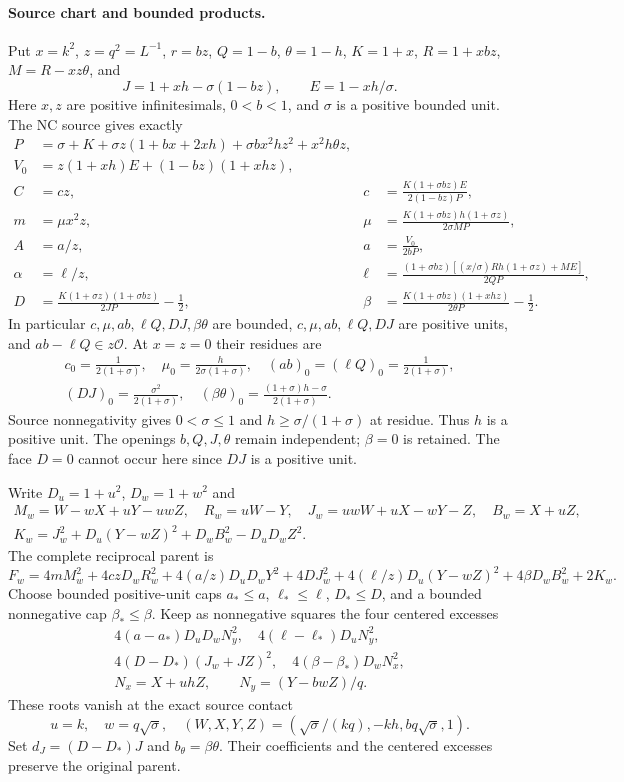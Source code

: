 \paragraph{Source chart and bounded products.}
Put $x=k^2$, $z=q^2=L^{-1}$, $r=bz$, $Q=1-b$, $\theta=1-h$,
$K=1+x$, $R=1+xbz$, $M=R-xz\theta$, and
\[
 J=1+xh-\sigma(1-bz),\qquad E=1-xh/\sigma.
\]
Here $x,z$ are positive infinitesimals, $0<b<1$, and $\sigma$ is a positive
bounded unit. The NC source gives exactly
\begin{align*}
 P&=\sigma+K+\sigma z(1+bx+2xh)+\sigma bx^2hz^2+x^2h\theta z,\\
 V_0&=z(1+xh)E+(1-bz)(1+xhz),\\
 C&=cz,&c&=\frac{K(1+\sigma bz)E}{2(1-bz)P},\\
 m&=\mu x^2z,&\mu&=\frac{K(1+\sigma bz)h(1+\sigma z)}{2\sigma MP},\\
 A&=a/z,&a&=\frac{V_0}{2bP},\\
 \alpha&=\ell/z,&\ell&=\frac{(1+\sigma bz)[(x/\sigma)Rh(1+\sigma z)+ME]}{2QP},\\
 D&=\frac{K(1+\sigma z)(1+\sigma bz)}{2JP}-\frac12,&
 \beta&=\frac{K(1+\sigma bz)(1+xhz)}{2\theta P}-\frac12.
\end{align*}
In particular $c,\mu,ab,\ell Q,DJ,\beta\theta$ are bounded,
$c,\mu,ab,\ell Q,DJ$ are positive units, and $ab-\ell Q\in z\mathcal O$.
At $x=z=0$ their residues are
\[
\begin{gathered}
c_0=\frac1{2(1+\sigma)},\quad
\mu_0=\frac h{2\sigma(1+\sigma)},\quad
(ab)_0=(\ell Q)_0=\frac1{2(1+\sigma)},\\
(DJ)_0=\frac{\sigma^2}{2(1+\sigma)},\quad
(\beta\theta)_0=\frac{(1+\sigma)h-\sigma}{2(1+\sigma)}.
\end{gathered}
\]
Source nonnegativity gives $0<\sigma\leq1$ and
$h\geq\sigma/(1+\sigma)$ at residue. Thus $h$ is a positive unit.
The openings $b,Q,J,\theta$ remain independent; $\beta=0$ is retained.
The face $D=0$ cannot occur here since $DJ$ is a positive unit.

Write $D_u=1+u^2$, $D_w=1+w^2$ and
\begin{gather*}
 M_w=W-wX+uY-uwZ,\quad R_w=uW-Y,\quad
 J_w=uwW+uX-wY-Z,\quad B_w=X+uZ,\\
 K_w=J_w^2+D_u(Y-wZ)^2+D_wB_w^2-D_uD_wZ^2.
\end{gather*}
The complete reciprocal parent is
\[
 F_w=4mM_w^2+4czD_wR_w^2+4(a/z)D_uD_wY^2
 +4DJ_w^2+4(\ell/z)D_u(Y-wZ)^2+4\beta D_wB_w^2+2K_w.
\]
Choose bounded positive-unit caps $a_*\leq a$, $\ell_*\leq\ell$,
$D_*\leq D$, and a bounded nonnegative cap $\beta_*\leq\beta$.
Keep as nonnegative squares the four centered excesses
\begin{gather*}
4(a-a_*)D_uD_wN_y^2,\quad4(\ell-\ell_*)D_uN_y^2,\\
4(D-D_*)(J_w+JZ)^2,\quad4(\beta-\beta_*)D_wN_x^2,\\
N_x=X+uhZ,\qquad N_y=(Y-bwZ)/q.
\end{gather*}
These roots vanish at the exact source contact
\[
u=k,\quad w=q\sqrt\sigma,\quad
(W,X,Y,Z)=(\sqrt\sigma/(kq),-kh,bq\sqrt\sigma,1).
\]
Set $d_J=(D-D_*)J$ and $b_\theta=\beta\theta$.
Their coefficients and the centered excesses preserve the original parent.

